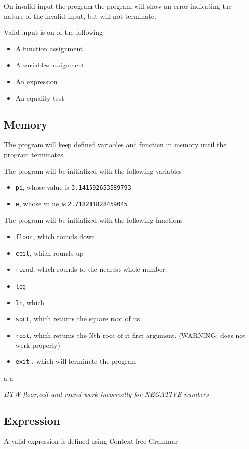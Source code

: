\documentclass[11pt,a4paper]{article}
\begin{document}
On invalid input the program the program will show an error
indicating the nature of the invalid input, but will not terminate.

Valid input is on of the following
\begin{itemize}
\item A function assignment
\item A variables assignment
\item An expression
\item An equality test
\end{itemize}
\subsection{Memory}
The program will keep defined variables and function in memory
until the program terminates.


The program will be initialized with the following variables
\begin{itemize}
\item \texttt{pi}, whose value is \texttt{3.141592653589793}
\item \texttt{e}, whose value is \texttt{2.718281828459045}
\end{itemize}


The program will be initialized with the following functions
\begin{itemize}
\item \texttt{floor}, which rounds down
\item \texttt{ceil}, which rounds up
\item \texttt{round}, which rounds to the nearest  whole number.
\item \texttt{log}
\item \texttt{ln}, which
\item \texttt{sqrt}, which returns the square root of its
\item \texttt{root}, which returns the Nth root of it first argument.  (WARNING: does not work properly)
\item \texttt{exit} , which will terminate the program
\end{itemize}
                               a                     a


\emph{BTW floor,ceil and round work incorrectly for NEGATIVE numbers}
\subsection{Expression}
A valid expression is defined using Context-free Grammar
\end{document}
